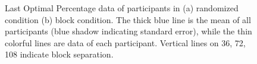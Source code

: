 \begin{figure}[ht]
\centering
{}
\decoRule
\caption[Last Optimal Percentage data of participants]{Last Optimal Percentage data of participants in (a) randomized condition (b) block condition. The thick blue line is the mean of all participants (blue shadow indicating standard error), while the thin colorful lines are data of each participant. Vertical lines on 36, 72, 108 indicate block separation. }
\label{fig:Last Optimal Percentage Participants}
\end{figure}

